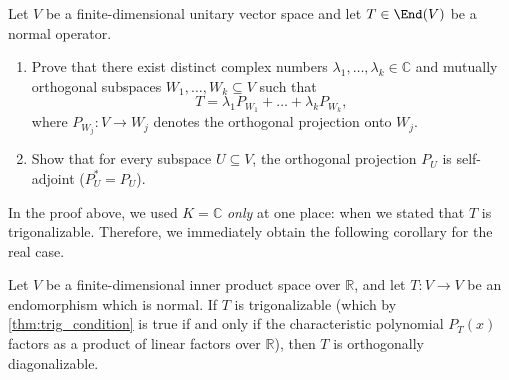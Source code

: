 \begin{exercise}
  \label{exc:spectral_decomposition_projections}
  Let $V$ be a finite-di\-men\-sional unitary vector space and let $T \in \End(V)$ be a normal operator.
  \begin{enumerate}[label=\textbf{(\alph*)}]
    \item Prove that there exist distinct complex numbers $\lambda_1, \dots, \lambda_k \in \mathbb{C}$ and mutually orthogonal subspaces $W_1, \dots, W_k \subseteq V$ such that
    \[
    T = \lambda_1 P_{W_1} + \dots + \lambda_k P_{W_k},
    \]
    where $P_{W_j} \colon V \to W_j$ denotes the orthogonal projection onto $W_j$.
    \item Show that for every subspace $U \subseteq V$, the orthogonal projection $P_U$ is self-adjoint ($P_U^* = P_U$).
  \end{enumerate}
\end{exercise}

\begin{remark}
In the proof above, we used $K = \mathbb{C}$ \emph{only} at one place: when we stated that $T$ is trigonalizable. Therefore, we immediately obtain the following corollary for the real case.
\end{remark}

\begin{corollary}
\label{cor:spectral_thm_real_trigonalizable}
Let $V$ be a finite-di\-men\-sional inner product space over $\mathbb{R}$, and let $T \colon V \to V$ be an endomorphism which is normal. If $T$ is trigonalizable (which by \cref{thm:trig_condition} is true if and only if the characteristic polynomial $P_T(x)$ factors as a product of linear factors over $\mathbb{R}$), then $T$ is orthogonally diagonalizable.
\end{corollary}


